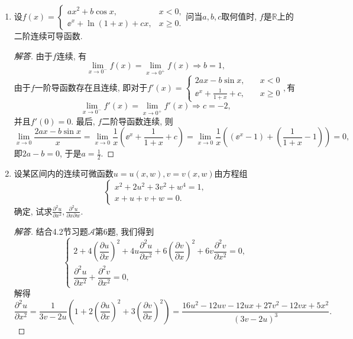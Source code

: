\begin{3a}
\begin{enumerate}
\begin{proof}[解答]
(8)归纳证明$y^{(n)}(0)=0$。假设这个结论对$1,\cdots,n-1$均成立，则
\begin{align*}
y^{(n)}(0)&=\lim_{x\to0}\frac{y^{(n-1)}(x)-y^{(n-1)}(0)}{x-0}\\
&=\lim_{x\to0}\frac{y^{(n-1)}(x)}{x}=\cdots\,\cdots\\
&=\lim_{x\to0}\frac{y^{(0)}(x)}{x^n}=\lim_{x\to0}\frac{{\rm e}^{-x^{-2}}}{x^n}=0.
\end{align*}
\end{proof}
\item 设\(f(x)=\begin{cases}
      ax^2+b\cos x,\qquad &x<0,\\\ee^{x}+\ln(1+x)+cx,&x\geqslant 0.
  \end{cases}\)问当\(a,b,c\)取何值时, \(f\)是\(\mathbb{R}\)上的二阶连续可导函数.
\begin{proof}[解答]
由于\(f\)连续, 有\[\lim_{x\rightarrow 0^-}f(x)=\lim_{x\rightarrow 0^+}f(x)\Rightarrow b=1,\]由于\(f\)一阶导函数存在且连续, 即对于\(f'(x)=\begin{cases}
2ax-b\sin x,\quad &x<0\\
\ee^x+\frac{1}{1+x}+c,&x\geqslant 0
\end{cases},\)有\[\lim_{x\rightarrow 0^-}f'(x)=\lim_{x\rightarrow 0^+}f'(x)\Rightarrow c=-2,\]
并且\(f'(0)=0\). 最后, \(f\)二阶导函数连续, 则
\[\lim_{x\rightarrow 0}\frac{2ax-b\sin x}{x}=\lim_{x\rightarrow 0}\frac{1}{x}\left(\ee^x+\frac{1}{1+x}+c\right)=\lim_{x\rightarrow 0}\frac{1}{x}\left(\left(\ee^x-1\right)+\left(\frac{1}{1+x}-1\right)\right)=0,\]
即\(2a-b=0\), 于是\(a=\frac{1}{2}\).
\end{proof}
\item 设某区间内的连续可微函数\(u=u(x,w),v=v(x,w)\)由方程组\[\begin{cases}
    x^2+2u^2+3v^2+w^4=1,\\x+u+v+w=0.
\end{cases}\]确定, 试求\(\frac{\partial^2u}{\partial x^2},\frac{\partial^2u}{\partial x\partial w}\).
\begin{proof}[解答]
结合4.2节习题\(\boldsymbol{\mathcal{A}}\)第6题, 我们得到\[\begin{cases}
2+4\left(\dfrac{\partial u}{\partial x}\right)^2+4u\dfrac{\partial^2u}{\partial x^2}
+6\left(\dfrac{\partial v}{\partial x}\right)^2+6v\dfrac{\partial^2v}{\partial x^2}=0,\\
\dfrac{\partial^2u}{\partial x^2}+\dfrac{\partial^2v}{\partial x^2}=0,
\end{cases}\]解得\[\frac{\partial^2u}{\partial x^2}
=\frac{1}{3v-2u}\left(1+2\left(\frac{\partial u}{\partial x}\right)^2+3\left(\frac{\partial v}{\partial x}\right)^2\right)
=\frac{16u^2-12uv-12ux+27v^2-12vx+5x^2}{(3v-2u)^3}.\]


\end{proof}
\end{enumerate}
\end{3a}
